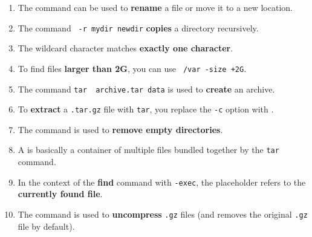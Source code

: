 \documentclass[a4paper]{report}
\begin{document}
\begin{enumerate}[1.]
\item The \texttt{\underline{\hspace{2cm}}} command can be used to \textbf{rename} a file or move it to a new location.

\item The command \texttt{\underline{\hspace{2cm}} -r mydir newdir} \textbf{copies} a directory recursively.

\item The wildcard character \texttt{\underline{\hspace{2cm}}} matches \textbf{exactly one character}.

\item To find files \textbf{larger than 2G}, you can use \texttt{\underline{\hspace{2cm}} /var -size +2G}.

\item The command \texttt{tar \underline{\hspace{2cm}} archive.tar data} is used to \textbf{create} an archive.

\item To \textbf{extract} a \texttt{.tar.gz} file with \texttt{tar}, you replace the \texttt{-c} option with \texttt{\underline{\hspace{2cm}}}.

\item The \texttt{\underline{\hspace{2cm}}} command is used to \textbf{remove empty directories}.

\item A \texttt{\underline{\hspace{2cm}}} is basically a container of multiple files bundled together by the \texttt{tar} command.

\item In the context of the \textbf{find} command with \texttt{-exec}, the placeholder \texttt{\underline{\hspace{2cm}}} refers to the \textbf{currently found file}.

\item The \texttt{\underline{\hspace{2cm}}} command is used to \textbf{uncompress} \texttt{.gz} files (and removes the original \texttt{.gz} file by default).
\end{enumerate}
\newpage
\end{document}
